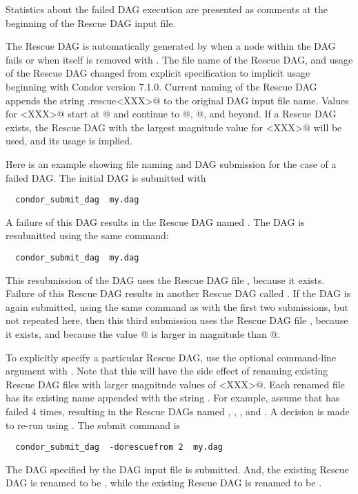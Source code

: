 Statistics about the failed DAG execution are presented as
comments at the beginning of the Rescue DAG input file.

The Rescue DAG is automatically generated by  when a node
within the DAG fails or when  itself is removed
with .
The file name of the Rescue DAG, and usage of the Rescue
DAG changed from explicit specification to implicit usage
beginning with Condor version 7.1.0.
Current naming of the Rescue DAG appends the string
\verb@.rescue<XXX>@ to the original DAG input file name.
Values for \verb@<XXX>@ start at @ and continue
to @, @, and beyond.
If a Rescue DAG exists,
the Rescue DAG with the largest magnitude value for \verb@<XXX>@
will be used, and its usage is implied.

Here is an example showing file naming and DAG submission
for the case of a failed DAG.
The initial DAG is submitted with
\begin{verbatim}
  condor_submit_dag  my.dag
\end{verbatim}
A failure of this DAG results in the Rescue DAG
named .
The DAG is resubmitted using the same command: 
\begin{verbatim}
  condor_submit_dag  my.dag
\end{verbatim}
This resubmission of the DAG uses the Rescue DAG file ,
because it exists.
Failure of this Rescue DAG results in another Rescue DAG
called .
If the DAG is again submitted, using the same command
as with the first two submissions, but not repeated here,
then this third submission uses the Rescue DAG file ,
because it exists, and because the value @ is larger
in magnitude than @.

To explicitly specify a particular Rescue DAG,
use the optional command-line argument 
with .
Note that this will have the side effect of renaming 
existing Rescue DAG files with larger magnitude values 
of \verb@<XXX>@.
Each renamed file has its existing name appended with
the string .
For example, assume that  has failed 4 times,
resulting in the Rescue DAGs named
,
,
,
and
.
A decision is made to re-run using .
The submit command is
\begin{verbatim}
  condor_submit_dag  -dorescuefrom 2  my.dag
\end{verbatim}
The DAG specified by the DAG input file 
is submitted.
And, the existing Rescue DAG  is
renamed to be ,
while the existing Rescue DAG  is
renamed to be .

